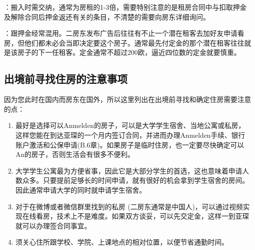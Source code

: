     ：搬入时需交纳，通常为房租的1-3倍，需要特别注意的是租房合同中与扣取押金及解除合同后押金返还有关的条目，不清楚的需要向房东详细询问。

    ：跟押金经常混用。二房东发布广告后往往有不止一个潜在租客去加好友申请看房，但他们都未必会当即决定要这个房子。通常最先付定金的那个潜在租客往往就是该房子的下一任租客。定金通常不超过200欧，逼近四位数的定金就要慎重。

  \subsection{出境前寻找住房的注意事项}

    因为您此时在国内而房东在国外，所以这里列出在出境前寻找和确定住房需要注意的点：

    \begin{enumerate}
      \item 最好是选择可以Anmelden的房子，可以是大学学生宿舍、当地公寓或私房，这样您能在到达亚琛的一个月内签订合同，并进而办理Anmelden手续、银行账户激活和公保申请(B.6章)。如果房子是临时住房，也一定要尽快确定可以An的房子，否则生活会有很多不便利。
      \item 大学学生公寓最为方便省事，因此它是大部分学生的首选，这也意味着申请人数众多。只要提前足够长的时间申请，就有很好的机会拿到学生宿舍的房间。因此通常申请大学的同时就申请学生宿舍。
      \item 对于在微博或者微信群里找到的私房 (二房东通常是中国人)，可以通过视频实现在线看房，技术上不是难度。如果双方谈妥，可以先交定金，这样一到亚琛就可以办理签合同事宜。
      \item 须关心住所跟学校、学院、上课地点的相对位置，以便节省通勤时间。
    \end{enumerate}
